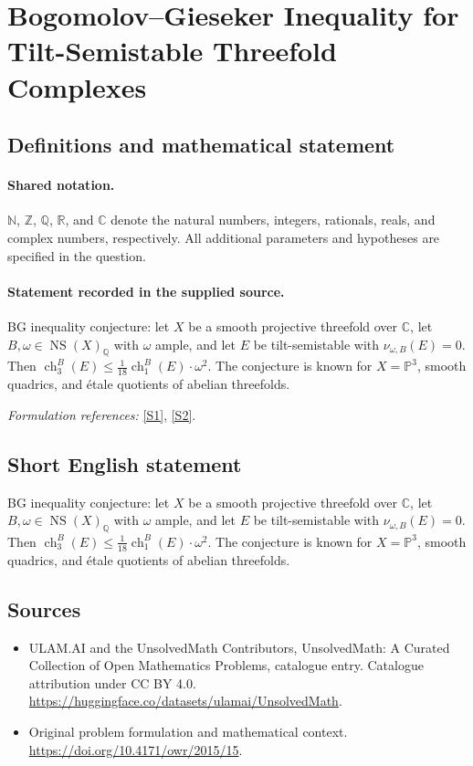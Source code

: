 \documentclass[11pt]{article}
\newcommand{\sref}[2]{\hyperlink{source:#1:#2}{[S#2]}}
\begin{document}
\section{Bogomolov–Gieseker Inequality for Tilt-Semistable Threefold Complexes}\label{statement}

\subsection{Definitions and mathematical statement}

\paragraph{Shared notation.}$\mathbb N$, $\mathbb Z$, $\mathbb Q$, $\mathbb R$, and $\mathbb C$ denote the natural numbers, integers, rationals, reals, and complex numbers, respectively. All additional parameters and hypotheses are specified in the question.


\paragraph{Statement recorded in the supplied source.}
BG inequality conjecture: let $X$ be a smooth projective threefold over $\mathbb C$, let $B,\omega\in\operatorname{NS}(X)_{\mathbb Q}$ with $\omega$ ample, and let $E$ be tilt-semistable with $\nu_{\omega,B}(E)=0$. Then $\operatorname{ch}^{B}_{3}(E)\leq\frac{1}{18}\operatorname{ch}^{B}_{1}(E)\cdot\omega^{2}$. The conjecture is known for $X=\mathbb P^{3}$, smooth quadrics, and étale quotients of abelian threefolds.
\par\smallskip\textit{Formulation references:} \sref{statement}{1}, \sref{statement}{2}.
\subsection{Short English statement}
BG inequality conjecture: let $X$ be a smooth projective threefold over $\mathbb C$, let $B,\omega\in\operatorname{NS}(X)_{\mathbb Q}$ with $\omega$ ample, and let $E$ be tilt-semistable with $\nu_{\omega,B}(E)=0$. Then $\operatorname{ch}^{B}_{3}(E)\leq\frac{1}{18}\operatorname{ch}^{B}_{1}(E)\cdot\omega^{2}$. The conjecture is known for $X=\mathbb P^{3}$, smooth quadrics, and étale quotients of abelian threefolds.
\subsection{Sources}
\begin{itemize}
\item[\hypertarget{source:statement:1}{S1}] ULAM.AI and the UnsolvedMath Contributors, UnsolvedMath: A Curated Collection of Open Mathematics Problems, catalogue entry. Catalogue attribution under CC BY 4.0.
\url{https://huggingface.co/datasets/ulamai/UnsolvedMath}.
\item[\hypertarget{source:statement:2}{S2}] Original problem formulation and mathematical context.
\url{https://doi.org/10.4171/owr/2015/15}.
\end{itemize}
\label{end:statement}
\end{document}
